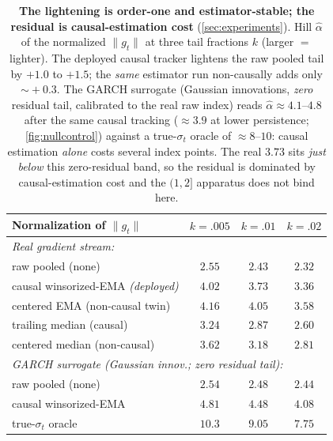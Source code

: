 \documentclass{article}
\newcommand{\norm}[1]{\lVert #1 \rVert}
\newcommand{\gt}{g_t}
\begin{document}
\begin{table}[htbp]
\caption{\textbf{The lightening is order-one and estimator-stable; the residual is
causal-estimation cost} (\cref{sec:experiments}). Hill $\hat\alpha$ of the normalized
$\norm{\gt}$ at three tail fractions $k$ (larger $=$ lighter). The deployed causal tracker
lightens the raw pooled tail by $+1.0$ to $+1.5$; the \emph{same} estimator run non-causally adds
only $\sim\!+0.3$. The GARCH surrogate (Gaussian innovations, \emph{zero} residual tail,
calibrated to the real raw index) reads $\hat\alpha\approx4.1$--$4.8$ after the same causal
tracking ($\approx3.9$ at lower persistence; \cref{fig:nullcontrol}) against a true-$\sigma_t$
oracle of $\approx8$--$10$: causal estimation \emph{alone} costs several index points. The real
$3.73$ sits \emph{just below} this zero-residual band, so the residual is dominated by
causal-estimation cost and the $(1,2]$ apparatus does not bind here.}
\label{tab:residual}
\centering
\begin{small}
\setlength{\tabcolsep}{5pt}
\begin{tabular}{lccc}
\toprule
Normalization of $\norm{\gt}$ & $k{=}.005$ & $k{=}.01$ & $k{=}.02$ \\
\midrule
\multicolumn{4}{l}{\emph{Real gradient stream:}}\\
raw pooled (none)                        & $2.55$ & $2.43$ & $2.32$ \\
causal winsorized-EMA \emph{(deployed)}  & $4.02$ & $3.73$ & $3.36$ \\
\quad centered EMA (non-causal twin)     & $4.16$ & $4.05$ & $3.58$ \\
trailing median (causal)                 & $3.24$ & $2.87$ & $2.60$ \\
\quad centered median (non-causal)       & $3.62$ & $3.18$ & $2.81$ \\
\midrule
\multicolumn{4}{l}{\emph{GARCH surrogate (Gaussian innov.; zero residual tail):}}\\
raw pooled (none)                        & $2.54$ & $2.48$ & $2.44$ \\
causal winsorized-EMA                    & $4.81$ & $4.48$ & $4.08$ \\
\quad true-$\sigma_t$ oracle             & $10.3$ & $9.05$ & $7.75$ \\
\bottomrule
\end{tabular}
\end{small}
\end{table}
\end{document}
